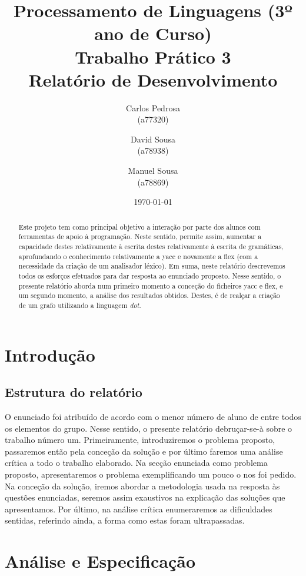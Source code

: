 \documentclass{report}
\title{Processamento de Linguagens (3º ano de Curso)\\ \textbf{Trabalho Prático 3}\\ Relatório de Desenvolvimento}
\author{Carlos Pedrosa\\ (a77320) \and David Sousa\\ (a78938) \and Manuel Sousa\\ (a78869)}
\date{\today}
\begin{document}
\maketitle

\begin{abstract}
Este projeto tem como principal objetivo a interação por parte dos alunos com ferramentas de apoio à programação. Neste sentido, permite assim, aumentar a capacidade destes relativamente à escrita destes relativamente à escrita de gramáticas, aprofundando o conhecimento relativamente a yacc e novamente a flex (com a necessidade da criação de um analisador léxico). Em suma, neste relatório descrevemos todos os esforços efetuados para dar resposta ao enunciado proposto. Nesse sentido, o presente relatório aborda num primeiro momento a conceção do ficheiros yacc e flex, e um segundo momento, a análise dos resultados obtidos. Destes, é de realçar a criação de um grafo utilizando a linguagem \textit{dot}.
\end{abstract}

\tableofcontents

\chapter{Introdução} \label{intro}

\section{Estrutura do relatório}
O enunciado foi atribuído de acordo com o menor número de aluno de entre todos os elementos do grupo. Nesse sentido, o presente relatório debruçar-se-à sobre o trabalho número um. Primeiramente, introduziremos o problema proposto, passaremos então pela conceção da solução e por último faremos uma análise crítica a todo o trabalho elaborado. Na secção enunciada como problema proposto, apresentaremos o problema exemplificando um pouco o nos foi pedido. Na conceção da solução, iremos abordar a metodologia usada na resposta às questões enunciadas, seremos assim exaustivos na explicação das soluções que apresentamos. Por último, na análise crítica enumeraremos as dificuldades sentidas, referindo ainda, a forma como estas foram ultrapassadas.


\chapter{Análise e Especificação} \label{ae}
\end{document}
